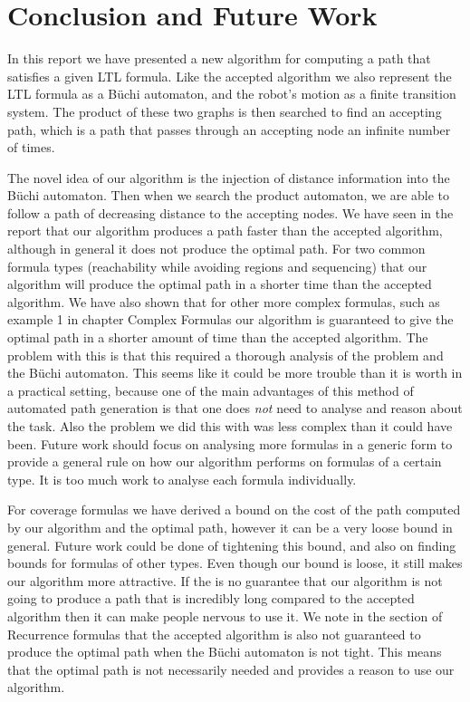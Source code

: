 \chapter{Conclusion and Future Work}
In this report we have presented a new algorithm for computing a path that satisfies a given LTL formula. Like the accepted algorithm we also represent the LTL formula as a B\"uchi automaton, and the robot's motion as a finite transition system. The product of these two graphs is then searched to find an accepting path, which is a path that passes through an accepting node an infinite number of times. 

The novel idea of our algorithm is the injection of distance information into the B\"uchi automaton. Then when we search the product automaton, we are able to follow a path of decreasing distance to the accepting nodes. We have seen in the report that our algorithm produces a path faster than the accepted algorithm, although in general it does not produce the optimal path. For two common formula types (reachability while avoiding regions and sequencing) that our algorithm will produce the optimal path in a shorter time than the accepted algorithm. We have also shown that for other more complex formulas, such as example 1 in chapter Complex Formulas our algorithm is guaranteed to give the optimal path in a shorter amount of time than the accepted algorithm. The problem with this is that this required a thorough analysis of the problem and the B\"uchi automaton. This seems like it could be more trouble than it is worth in a practical setting, because one of the main advantages of this method of automated path generation is that one does \textit{not} need to analyse and reason about the task. Also the problem we did this with was less complex than it could have been. Future work should focus on analysing more formulas in a generic form to provide a general rule on how our algorithm performs on formulas of a certain type. It is too much work to analyse each formula individually.    

For coverage formulas we have derived a bound on the cost of the path computed by our algorithm and the optimal path, however it can be a very loose bound in general. Future work could be done of tightening this bound, and also on finding bounds for formulas of other types. Even though our bound is loose, it still makes our algorithm more attractive. If the is no guarantee that our algorithm is not going to produce a path that is incredibly long compared to the accepted algorithm then it can make people nervous to use it. We note in the section of Recurrence formulas that the accepted algorithm is also not guaranteed to produce the optimal path when the B\"uchi automaton is not tight. This means that the optimal path is not necessarily needed and provides a reason to use our algorithm.

